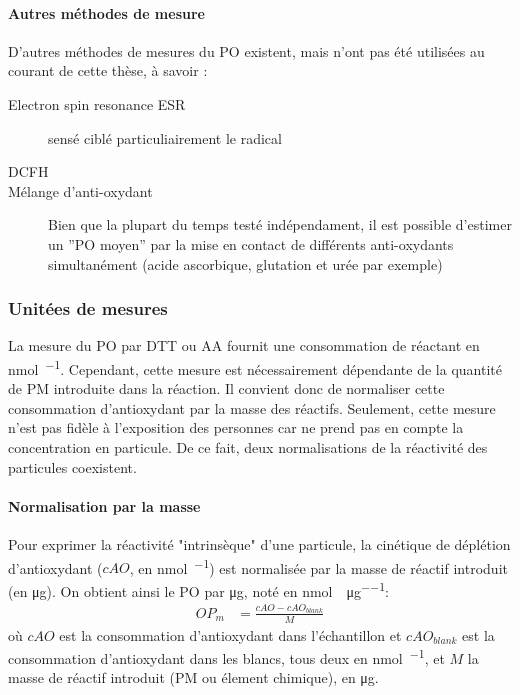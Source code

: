 \paragraph{Autres méthodes de mesure}%
\label{sub:autres_methodes_de_mesure}

D'autres méthodes de mesures du PO existent, mais n'ont pas été utilisées au courant de
cette thèse, à savoir :
\begin{description}
    \item[Electron spin resonance ESR] sensé ciblé particuliairement le radical
         \autocite{shiHydroxyl2003,shiTemporal2003}
    \item[DCFH]
    \item[Mélange d'anti-oxydant] Bien que la plupart du temps testé indépendament, il est
        possible d'estimer un ''PO moyen'' par la mise en contact de différents
        anti-oxydants simultanément (acide ascorbique, glutation et urée par exemple)~\autocite{calasComparison2018}
\end{description}

\subsubsection{Unitées de mesures}%
\label{ssub:unitees_de_mesures}

La mesure du PO par DTT ou AA fournit une consommation de réactant en \si{\nano\mole\per\min}.
Cependant, cette mesure est nécessairement dépendante de la quantité de PM introduite dans
la réaction.
Il convient donc de normaliser cette consommation d'antioxydant par la masse des réactifs.
Seulement, cette mesure n'est pas fidèle à l'exposition des personnes car ne prend pas en
compte la concentration en particule. De ce fait, deux normalisations de la réactivité des
particules coexistent.

\paragraph{Normalisation par la masse}%
\label{par:normalisation_par_la_masse}
Pour exprimer la réactivité "intrinsèque" d'une particule, la cinétique de déplétion
d'antioxydant ($cAO$, en \si{\nmol\per\min}) est normalisée par la masse de réactif
introduit (en \si{\ug}). On obtient ainsi le PO par \si{\ug}, noté \OPm{} en
\si{\nmol\per\min\per\micro\g}:
\begin{align}
    \label{eq:opm}
    OP_m &= \frac{cAO - cAO_{blank}}{M}
\end{align}
où $cAO$ est la consommation d'antioxydant dans l'échantillon et $cAO_{blank}$
est la consommation d'antioxydant dans les blancs, tous deux en \si{\nmol\per\min}, et $M$
la masse de réactif introduit (PM ou élement chimique), en \si{\ug}.

